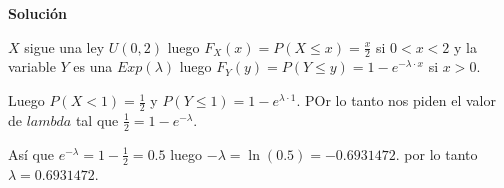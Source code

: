 \documentclass[
]{article}
\begin{document}
\textbf{Solución}

\(X\) sigue una ley \(U(0,2)\) luego \(F_X(x)=P(X\leq x)=\frac{x}{2}\)
si \(0<x<2\) y la variable \(Y\) es una \(Exp(\lambda)\) luego
\(F_Y(y)=P(Y\leq y)=1-e^{-\lambda\cdot x}\) si \(x>0\).

Luego \(P(X<1)=\frac{1}{2}\) y \(P(Y\leq 1)=1-e^{\lambda\cdot 1}\). POr
lo tanto nos piden el valor de \(lambda\) tal que
\(\frac{1}{2}=1-e^{-\lambda}\).

Así que \(e^{-\lambda}=1-\frac12=0.5\) luego
\(-\lambda=\ln(0.5)=-0.6931472.\) por lo tanto \(\lambda=0.6931472.\)
\end{document}
